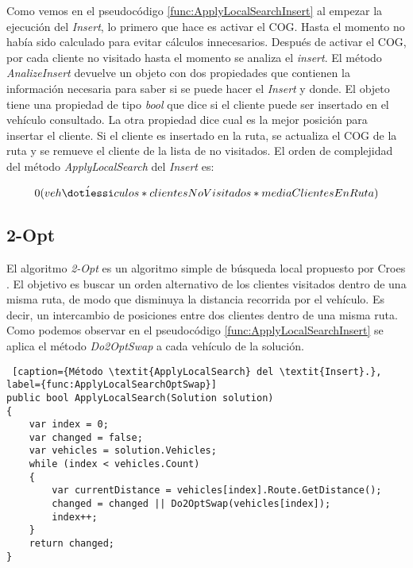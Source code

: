\bigskip

Como vemos en el pseudocódigo \ref{func:ApplyLocalSearchInsert} al empezar la ejecución del \textit{Insert}, lo primero que hace es activar el COG. Hasta el momento no había sido calculado para evitar cálculos innecesarios. Después de activar el COG, por cada cliente no visitado hasta el momento se analiza el \textit{insert}. El método \textit{AnalizeInsert} devuelve un objeto con dos propiedades que contienen la información necesaria para saber si se puede hacer el \textit{Insert} y donde. El objeto tiene una propiedad de tipo \textit{bool} que dice si el cliente puede ser insertado en el vehículo consultado. La otra propiedad dice cual es la mejor posición para insertar el cliente. Si el cliente es insertado en la ruta, se actualiza el COG de la ruta y se remueve el cliente de la lista de no visitados. El orden de complejidad del método \textit{ApplyLocalSearch} del \textit{Insert} es: 

\begin{equation*}
0(veh\acute{\dotlessi}culos * clientesNoVisitados * mediaClientesEnRuta)
\end{equation*}

\subsection{2-Opt}

El algoritmo \textit{2-Opt} es un algoritmo simple de búsqueda local propuesto por Croes \cite{Croes}. El objetivo es buscar un orden alternativo de los clientes visitados dentro de una misma ruta, de modo que disminuya la distancia recorrida por el vehículo. Es decir, un intercambio de posiciones entre dos clientes dentro de una misma ruta. Como podemos observar en el pseudocódigo \ref{func:ApplyLocalSearchInsert} se aplica el método \textit{Do2OptSwap} a cada vehículo de la solución.

\begin{minipage}{\textwidth}
\begin{lstlisting} [caption={Método \textit{ApplyLocalSearch} del \textit{Insert}.}, label={func:ApplyLocalSearchOptSwap}]
public bool ApplyLocalSearch(Solution solution)
{
	var index = 0;
	var changed = false;	
	var vehicles = solution.Vehicles;	
	while (index < vehicles.Count)
	{
		var currentDistance = vehicles[index].Route.GetDistance();
		changed = changed || Do2OptSwap(vehicles[index]);
		index++;
	}
	return changed;
}
\end{lstlisting}
\end{minipage}

